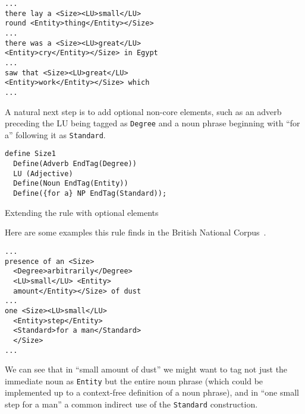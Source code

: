 \documentclass{llncs}
\begin{document}
\hfill \break
  \small
  \begin{framed}
\begin{verbatim}
...
there lay a <Size><LU>small</LU>
round <Entity>thing</Entity></Size>
...
there was a <Size><LU>great</LU>
<Entity>cry</Entity></Size> in Egypt
...
saw that <Size><LU>great</LU>
<Entity>work</Entity></Size> which
...
\end{verbatim}
\end{framed}
\normalsize

A natural next step is to add optional non-core elements, such as an adverb
preceding the LU being tagged as \verb+Degree+ and a noun phrase beginning with
``for a'' following it as \verb+Standard+.

\begin{table}[h]
  \small
  \begin{framed}
\begin{verbatim}
define Size1
  Define(Adverb EndTag(Degree))
  LU (Adjective)
  Define(Noun EndTag(Entity))
  Define({for a} NP EndTag(Standard));
\end{verbatim}
\end{framed}
\normalsize
\caption{Extending the rule with optional elements}
\end{table}

Here are some examples this rule finds in the British National
Corpus~\cite{bnc}.

  \small
  \begin{framed}
\begin{verbatim}
...
presence of an <Size>
  <Degree>arbitrarily</Degree>
  <LU>small</LU> <Entity>
  amount</Entity></Size> of dust
...
one <Size><LU>small</LU>
  <Entity>step</Entity>
  <Standard>for a man</Standard>
  </Size>
...
\end{verbatim}
  \end{framed}
  \normalsize

We can see that in ``small amount of dust'' we might want to
tag not just the immediate noun as \verb+Entity+ but the entire noun phrase
(which could be implemented up to a context-free definition of a noun phrase),
and in ``one small step for a man'' a common indirect use of the \verb+Standard+
construction.
\end{document}
